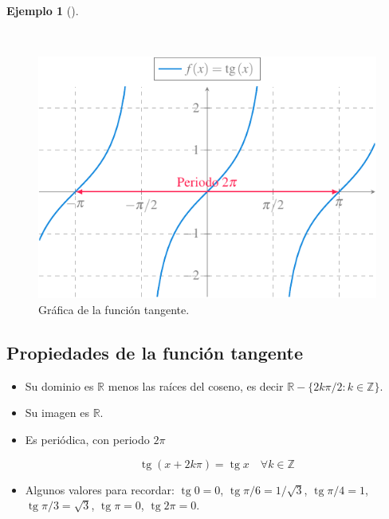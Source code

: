 \documentclass[
  a4paper,
]{scrreport}
\theoremstyle{definition}
\newtheorem{example}{Ejemplo}[chapter]
\theoremstyle{plain}
\theoremstyle{definition}
\theoremstyle{definition}
\theoremstyle{plain}
\theoremstyle{plain}
\theoremstyle{remark}
\begin{document}
\begin{example}[]\protect\hypertarget{exm-funcion-tangente}{}\label{exm-funcion-tangente}

~

\begin{figure}[H]

{\centering \includegraphics[width=5.20833in,height=\textheight]{./img/funciones/funcion-tangente.pdf}

}

\caption{Gráfica de la función tangente.}

\end{figure}%

\end{example}

\subsection{Propiedades de la función
tangente}\label{propiedades-de-la-funciuxf3n-tangente}

\begin{itemize}
\item
  Su dominio es \(\mathbb{R}\) menos las raíces del coseno, es decir
  \(\mathbb{R}-\{2k\pi/2: k\in \mathbb{Z}\}\).
\item
  Su imagen es \(\mathbb{R}\).
\item
  Es periódica, con periodo \(2\pi\)

  \[\operatorname{tg} (x+2k\pi)= \operatorname{tg} x\quad \forall k\in \mathbb{Z}\]
\item
  Algunos valores para recordar: \(\operatorname{tg} 0=0\),
  \(\operatorname{tg} \pi/6= 1/\sqrt{3}\),
  \(\operatorname{tg} \pi/4=1\), \(\operatorname{tg} \pi/3= \sqrt{3}\),
  \(\operatorname{tg} \pi =0\), \(\operatorname{tg} 2\pi=0\).
\end{itemize}
\end{document}
